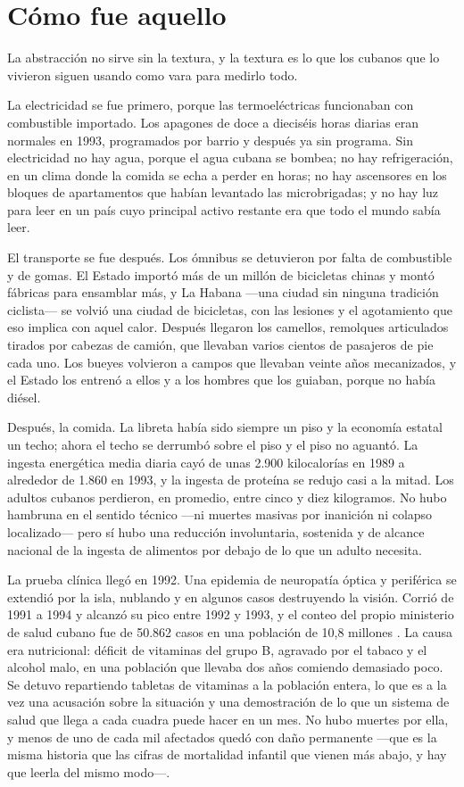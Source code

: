 \section{Cómo fue aquello}

La abstracción no sirve sin la textura, y la textura es lo que los cubanos que lo
vivieron siguen usando como vara para medirlo todo.

La electricidad se fue primero, porque las termoeléctricas funcionaban con
combustible importado. Los apagones de doce a dieciséis horas diarias eran
normales en 1993, programados por barrio y después ya sin programa. Sin
electricidad no hay agua, porque el agua cubana se bombea; no hay refrigeración,
en un clima donde la comida se echa a perder en horas; no hay ascensores en los
bloques de apartamentos que habían levantado las microbrigadas; y no hay luz para
leer en un país cuyo principal activo restante era que todo el mundo sabía leer.

El transporte se fue después. Los ómnibus se detuvieron por falta de combustible y
de gomas. El Estado importó más de un millón de bicicletas chinas y montó fábricas
para ensamblar más, y La Habana ---una ciudad sin ninguna tradición ciclista---
se volvió una ciudad de bicicletas, con las lesiones y el agotamiento que eso
implica con aquel calor. Después llegaron los camellos, remolques articulados
tirados por cabezas de camión, que llevaban varios cientos de pasajeros de pie
cada uno. Los bueyes volvieron a campos que llevaban veinte años mecanizados, y el
Estado los entrenó a ellos y a los hombres que los guiaban, porque no había diésel.

Después, la comida. La libreta había sido siempre un piso y la economía estatal un
techo; ahora el techo se derrumbó sobre el piso y el piso no aguantó. La ingesta
energética media diaria cayó de unas 2.900 kilocalorías en 1989 a alrededor de
1.860 en 1993, y la ingesta de proteína se redujo casi a la mitad.\unv{} Los
adultos cubanos perdieron, en promedio, entre cinco y diez kilogramos. No hubo
hambruna en el sentido técnico ---ni muertes masivas por inanición ni colapso
localizado--- pero sí hubo una reducción involuntaria, sostenida y de alcance
nacional de la ingesta de alimentos por debajo de lo que un adulto necesita.

La prueba clínica llegó en 1992. Una epidemia de neuropatía óptica y periférica se
extendió por la isla, nublando y en algunos casos destruyendo la visión. Corrió
de 1991 a 1994 y alcanzó su pico entre 1992 y 1993, y el conteo del propio
ministerio de salud cubano fue de 50.862 casos en una población de 10,8 millones
\citep{mmwr1994}. La causa era nutricional: déficit de vitaminas del grupo B,
agravado por el tabaco y el alcohol malo, en una población que llevaba dos años
comiendo demasiado poco. Se detuvo repartiendo tabletas de vitaminas a la
población entera, lo que es a la vez una acusación sobre la situación y una
demostración de lo que un sistema de salud que llega a cada cuadra puede hacer en
un mes. No hubo muertes por ella, y menos de uno de cada mil afectados quedó con
daño permanente ---que es la misma historia que las cifras de mortalidad infantil
que vienen más abajo, y hay que leerla del mismo modo---.

